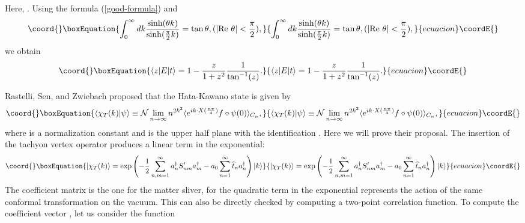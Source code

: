 \documentclass[a4paper,12pt]{article}
\begin{document}
Here, \coordHE{}.
Using the formula (\ref{good-formula}) and
\begin{equation}\coord{}\boxEquation{
\int_0^{\infty}dk\frac{\sinh(\theta k)}{\sinh(\frac{\pi}{2}k)}
=\tan\theta,(|{\rm Re}\ \theta|<\frac{\pi}{2}),
}{
\int_0^{\infty}dk\frac{\sinh(\theta k)}{\sinh(\frac{\pi}{2}k)}
=\tan\theta,(|{\rm Re}\ \theta|<\frac{\pi}{2}),
}{ecuacion}\coordE{}\end{equation}
we obtain
\begin{equation}\coord{}\boxEquation{\label{zet}
\langle z|E|t\rangle
=1-\frac{z}{1+z^2}\frac{1}{\tan^{-1}(z)}.
}{\langle z|E|t\rangle
=1-\frac{z}{1+z^2}\frac{1}{\tan^{-1}(z)}.
}{ecuacion}\coordE{}\end{equation}

Rastelli, Sen, and Zwiebach proposed that the Hata-Kawano state is
given by
\begin{equation}\coord{}\boxEquation{\label{tachyon-def}
\langle \chi_T(k)|\psi\rangle\equiv {\cal
N}\lim_{n\rightarrow\infty}n^{2k^2}\langle e^{ik\cdot
X(\frac{n\pi}{4})} f\circ\psi(0)\rangle_{C_n},
}{\langle \chi_T(k)|\psi\rangle\equiv {\cal
N}\lim_{n\rightarrow\infty}n^{2k^2}\langle e^{ik\cdot
X(\frac{n\pi}{4})} f\circ\psi(0)\rangle_{C_n},
}{ecuacion}\coordE{}\end{equation}
where \coordHE{} is a normalization constant and \coordHE{} is the upper 
half plane with the identification \coordHE{} 
\cite{RSZboundary}.
Here we will prove their proposal.
 The insertion of the
tachyon vertex operator produces a linear term in the exponential:
\begin{equation}\coord{}\boxEquation{
|\chi_T(k)\rangle=\exp\left(-\frac{1}{2}\sum_{n,m=1}^{\infty}
a^{\dagger}_n S'_{nm} a^{\dagger}_m
-a_0 \sum_{n=1}^{\infty}\widehat{t}_n a^{\dagger}_n\right)|k\rangle
}{
|\chi_T(k)\rangle=\exp\left(-\frac{1}{2}\sum_{n,m=1}^{\infty}
a^{\dagger}_n S'_{nm} a^{\dagger}_m
-a_0 \sum_{n=1}^{\infty}\widehat{t}_n a^{\dagger}_n\right)|k\rangle
}{ecuacion}\coordE{}\end{equation}
The coefficient matrix \coordHE{} is the one for the matter sliver, for
the quadratic term in the exponential represents the action of the
same conformal transformation \coordHE{} on the vacuum. This can also be
directly checked by computing a two-point correlation function. To
compute the coefficient vector \coordHE{}, let us consider the
function
\end{document}
